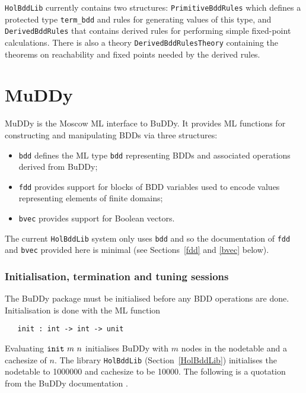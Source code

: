 \documentclass[12pt]{article}
\newcommand{\bnind}[1]{\index[MLbn]{#1}}
\renewcommand{\t}[1]{\mbox{\tt #1}}
\newcommand{\ml}[1]{{\tt #1}}
\newcommand\termbddty{\texttt{term\_bdd}\xspace}
\newcommand{\Buddy}{BuDDy\xspace}
\newcommand{\Muddy}{MuDDy\xspace}
\newcommand\HolBuddy{\texttt{HolBddLib}\xspace}
\begin{document}
\t{HolBddLib} currently contains two structures: \t{PrimitiveBddRules}
which defines a protected type \termbddty and rules for generating
values of this type, and \t{DerivedBddRules} that contains derived
rules for performing simple fixed-point calculations.  There is also a
theory \t{DerivedBddRulesTheory} containing the theorems on
reachability and fixed points needed by the derived rules.

\newpage
\tableofcontents

\newpage

\part{\Muddy}\label{muddy}

\Muddy is the Moscow
ML interface to \Buddy. It provides ML functions for constructing and
manipulating BDDs via three structures:

\begin{itemize}

\item \t{bdd} defines the ML type
\t{bdd} representing BDDs and associated operations derived from \Buddy;


\item \t{fdd} provides support for blocks of BDD variables
used to encode values representing elements of finite domains;

\item \t{bvec} provides support for Boolean vectors.

\end{itemize}

The current \HolBuddy{} system only uses \t{bdd} and so
the documentation of \t{fdd} and \t{bvec} provided here is minimal
(see Sections~\ref{fdd} and \ref{bvec} below).

\section{Initialisation, termination and tuning sessions}\label{init}

The \Buddy{} package must be initialised before any BDD operations are done.
Initialisation is done with the ML function

\begin{verbatim}
   init : int -> int -> unit
\end{verbatim}\bnind{\ml{init}}

Evaluating $\t{init}~m~n$ initialises \Buddy{} with $m$ nodes in the
nodetable and a cachesize of $n$.  
The library \t{HolBddLib} (Section~\ref{HolBddLib}) 
initialises the nodetable to 1000000 and cachesize to
be 10000. The following is a quotation from the \Buddy{} documentation \cite{BuDDy}.
\end{document}
